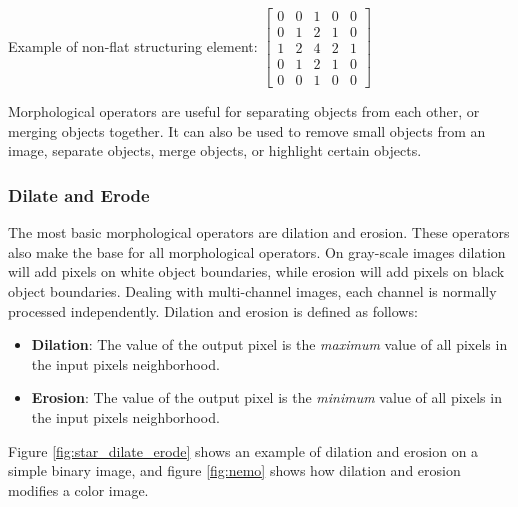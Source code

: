 \noindent Example of non-flat structuring element:
$\begin{bmatrix}
    0 & 0 & 1 & 0 & 0 \\
    0 & 1 & 2 & 1 & 0 \\
    1 & 2 & 4 & 2 & 1 \\
    0 & 1 & 2 & 1 & 0 \\
    0 & 0 & 1 & 0 & 0
\end{bmatrix}$ 

Morphological operators are useful for separating objects from each other, or merging objects together. It can also be used to remove small objects from an image, separate objects, merge objects, or highlight certain objects.


\subsubsection{Dilate and Erode}
The most basic morphological operators are dilation and erosion. These operators also make the base for all morphological operators. On gray-scale images dilation will add pixels on white object boundaries, while erosion will add pixels on black object boundaries. Dealing with multi-channel images, each channel is normally processed independently. Dilation and erosion is defined as follows:
\begin{itemize}
    \item \textbf{Dilation}: The value of the output pixel is the \textit{maximum} value of all pixels in the input pixels neighborhood.\cite{website:mathworks_morphology} 
    \item \textbf{Erosion}: The value of the output pixel is the \textit{minimum} value of all pixels in the input pixels neighborhood.\cite{website:mathworks_morphology}
\end{itemize}

Figure \ref{fig:star_dilate_erode} shows an example of dilation and erosion on a simple binary image, and figure \ref{fig:nemo} shows how dilation and erosion modifies a color image.


